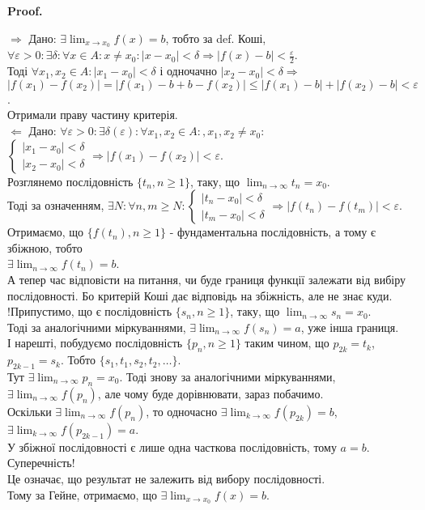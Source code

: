 \documentclass[a4paper, 14pt]{article}
\makeatletter
\def\huge{\displaystyle}
\def\qed{$\blacksquare$}
\def\rightproof{$\boxed{\Rightarrow}$ }
\def\leftproof{$\boxed{\Leftarrow}$ }
\theoremstyle{theoremdd}
\theoremstyle{theoremdd}
\theoremstyle{theoremdd}
\theoremstyle{theoremdd}
\theoremstyle{theoremdd}
\theoremstyle{theoremdd}
\theoremstyle{theoremdd}
\theoremstyle{theoremdd}
\renewenvironment{proof}[1][Proof.\\]{\par
\pushQED{\hfill \qed}%
\normalfont \topsep6\p@\@plus6\p@\relax
\trivlist
\item\relax
{\bfseries
#1\@addpunct{.}}\hspace\labelsep\ignorespaces
}{%
\popQED\endtrivlist\@endpefalse
}
\makeatother
\begin{document}
	\begin{proof}
\rightproof Дано: $\exists \huge \lim_{x \to x_0} f(x) = b$, тобто за def. Коші,\\
$\forall \varepsilon > 0: \exists \delta: \forall x \in A: x \neq x_0: |x-x_0|<\delta \Rightarrow |f(x)-b|< \huge \frac{\varepsilon}{2}$.\\
Тоді $\forall x_1, x_2 \in A: |x_1 - x_0| < \delta$ і одночачно $|x_2 - x_0| < \delta \Rightarrow$\\
$|f(x_1)-f(x_2)| = |f(x_1)-b + b - f(x_2)| \leq |f(x_1) - b| + |f(x_2)-b| < \varepsilon$.\\
Отримали праву частину критерія.
\bigskip \\
\leftproof Дано: $\forall \varepsilon > 0: \exists \delta(\varepsilon): \forall x_1,x_2 \in A:, x_1,x_2 \neq x_0:$
$\begin{cases} |x_1-x_0|<\delta \\ |x_2-x_0|<\delta \end{cases} \Rightarrow |f(x_1)-f(x_2)|<\varepsilon$.\\
Розглянемо послідовність $\{t_n, n \geq 1\}$, таку, що $\huge \lim_{n \to \infty} t_n = x_0$.\\
Тоді за означенням, $\exists N: \forall n,m \geq N: \begin{cases} |t_n-x_0|<\delta \\ |t_m-x_0|<\delta \end{cases} \Rightarrow |f(t_n)-f(t_m)|<\varepsilon$.\\
Отримаємо, що $\{f(t_n),n \geq 1\}$ - фундаментальна послідовність, а тому є збіжною, тобто\\
$\exists \huge \lim_{n \to \infty} f(t_n) = b$.\\
А тепер час відповісти на питання, чи буде границя функції залежати від вибіру послідовності. Бо критерій Коші дає відповідь на збіжність, але не знає куди.\\
!Припустимо, що є послідовність $\{s_n, n \geq 1\}$, таку, що $\huge \lim_{n \to \infty} s_n = x_0$.\\
Тоді за аналогічними міркуваннями, $\exists \huge \lim_{n \to \infty} f(s_n) = a$, уже інша границя.
\bigskip \\
І нарешті, побудуємо послідовність $\{p_n, n \geq 1\}$ таким чином, що $p_{2k} = t_k$, $p_{2k-1} = s_k$. Тобто $\{s_1, t_1, s_2, t_2, \dots \}$.\\
Тут $\exists \huge \lim_{n \to \infty} p_n = x_0$. Тоді знову за аналогічними міркуваннями, $\exists \huge \lim_{n \to \infty} f(p_n)$, але чому буде дорівнювати, зараз побачимо.\\
Оскільки $\exists \huge \lim_{n \to \infty} f(p_n)$, то одночасно $\exists \huge \lim_{k \to \infty} f(p_{2k}) = b$, $\exists \huge \lim_{k \to \infty} f(p_{2k-1}) = a$.\\
У збіжної послідовності є лише одна часткова послідовність, тому $a = b$. Суперечність!\\
Це означає, що результат не залежить від вибору послідовності.\\
Тому за Гейне, отримаємо, що $\exists \huge \lim_{x \to x_0} f(x) = b$.
\end{proof}
\end{document}
